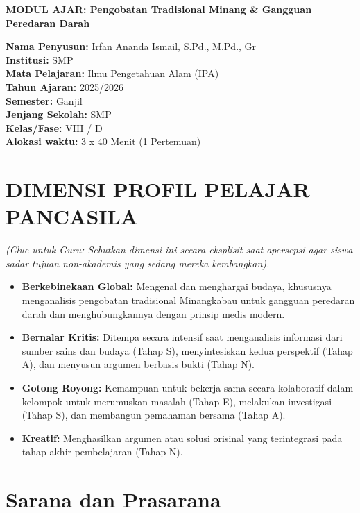 \documentclass[a4paper,12pt]{article}
\begin{document}
\begin{center}
{\Large\textbf{MODUL AJAR: Pengobatan Tradisional Minang \& Gangguan Peredaran Darah}}
\end{center}

\vspace{0.5cm}

\begin{tcolorbox}[mainbox]
\textbf{Nama Penyusun:} Irfan Ananda Ismail, S.Pd., M.Pd., Gr \\
\textbf{Institusi:} SMP \\
\textbf{Mata Pelajaran:} Ilmu Pengetahuan Alam (IPA) \\
\textbf{Tahun Ajaran:} 2025/2026 \\
\textbf{Semester:} Ganjil \\
\textbf{Jenjang Sekolah:} SMP \\
\textbf{Kelas/Fase:} VIII / D \\
\textbf{Alokasi waktu:} 3 x 40 Menit (1 Pertemuan)
\end{tcolorbox}

\section{DIMENSI PROFIL PELAJAR PANCASILA}
\textit{(Clue untuk Guru: Sebutkan dimensi ini secara eksplisit saat apersepsi agar siswa sadar tujuan non-akademis yang sedang mereka kembangkan).}

\begin{itemize}
\item \textbf{Berkebinekaan Global:} Mengenal dan menghargai budaya, khususnya menganalisis pengobatan tradisional Minangkabau untuk gangguan peredaran darah dan menghubungkannya dengan prinsip medis modern.
\item \textbf{Bernalar Kritis:} Ditempa secara intensif saat menganalisis informasi dari sumber sains dan budaya (Tahap S), menyintesiskan kedua perspektif (Tahap A), dan menyusun argumen berbasis bukti (Tahap N).
\item \textbf{Gotong Royong:} Kemampuan untuk bekerja sama secara kolaboratif dalam kelompok untuk merumuskan masalah (Tahap E), melakukan investigasi (Tahap S), dan membangun pemahaman bersama (Tahap A).
\item \textbf{Kreatif:} Menghasilkan argumen atau solusi orisinal yang terintegrasi pada tahap akhir pembelajaran (Tahap N).
\end{itemize}

\section{Sarana dan Prasarana}
\end{document}
